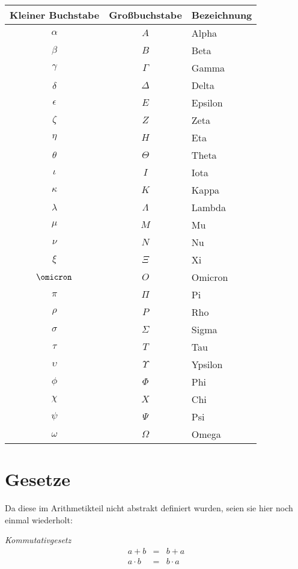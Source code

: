\begin{tabular}{c|c|l}
\hline
\textbf{Kleiner Buchstabe} & \textbf{Großbuchstabe} & \textbf{Bezeichnung} \\
\hline
$\alpha $ & $A $ & Alpha \\
$\beta $ & $B $ & Beta \\
$\gamma $ & $\Gamma $ & Gamma \\
$\delta $ & $\Delta $ & Delta \\
$\epsilon $ & $E $ & Epsilon \\
$\zeta $ & $Z $ & Zeta \\
$\eta $ & $H $ &  Eta\\
$\theta $ & $\Theta $ & Theta \\
$\iota $ & $I $ & Iota \\
$\kappa $ & $K $ & Kappa \\
$\lambda $ & $\Lambda $ & Lambda \\
$\mu $ & $M $ & Mu \\
$\nu $ & $N $ & Nu \\
$\xi $ & $\Xi $ &  Xi \\
$\omicron $ & $O $ & Omicron \\
$\pi $ & $\Pi $ & Pi \\
$\rho $ & $P $ & Rho \\
$\sigma $ & $\Sigma $ & Sigma  \\
$\tau $ & $T $ & Tau \\
$\upsilon $ & $\Upsilon $ & Ypsilon \\
$\phi $ & $\Phi $ & Phi \\
$\chi $ & $X $ & Chi \\
$\psi $ & $\Psi $ & Psi \\
$\omega $ & $\Omega $ & Omega \\
\hline
\end{tabular}

\section{Gesetze}

Da diese im Arithmetikteil nicht abstrakt definiert wurden, seien sie hier noch einmal wiederholt:

\bigskip

\noindent \textsl{Kommutativgesetz}
\begin{eqnarray*}
a+b &=& b+a \\
a\cdot b &=& b\cdot a
\end{eqnarray*}

